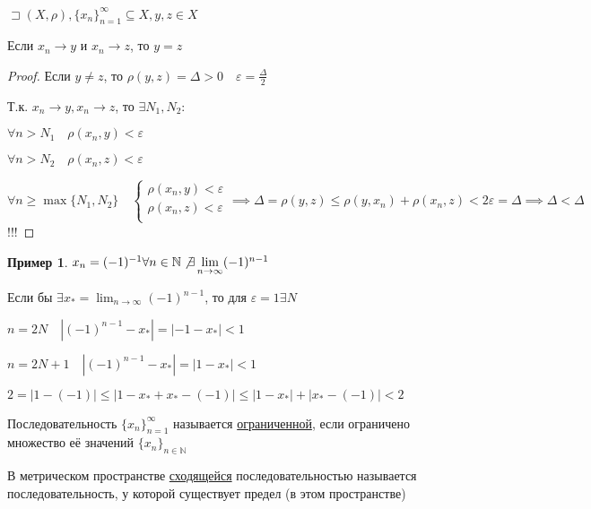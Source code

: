 \documentclass{book}
\newcommand\N{\ensuremath{\mathbb{N}}}
\theoremstyle{definition}
\newtheorem*{example}{Пример}
\begin{document}
    \begin{statement}

        $\sqsupset (X, \rho), \{x_n\}_{n=1}^{\infty }\subseteq X, y, z\in X $

        Если $x_n\to y$ и $x_n\to z$, то $y=z$
    \end{statement}
    \begin{proof}
        Если $y\neq z$, то $\rho(y,z) = \Delta>0\quad \varepsilon = \frac{\Delta}{2}$

        Т.к. $x_n \to y, x_{n} \to z$, то $\exists N_1, N_2:$

        $\forall n>N_1\quad \rho(x_n,y)<\varepsilon$

        $\forall n>N_2\quad \rho(x_n,z)<\varepsilon$

        $\forall n\geqslant \max\{N_1, N_2\}\quad \begin{cases}
            \rho(x_{n} , y)<\varepsilon \\
            \rho(x_{n} , z)<\varepsilon\\
        \end{cases} \implies  \Delta = \rho(y,z) \leqslant  \rho(y, x_{n}) + \rho(x_{n} , z)<2\varepsilon = \Delta \implies \Delta<\Delta $ !!!
    \end{proof}
    \begin{example}
        $x_n = (-1)^{-1} \forall n\in \N  \not\exists \lim_{n \to \infty} (-1)^{n-1}$

        Если бы $\exists x_* = \lim_{n \to \infty} (-1)^{n-1}$, то для $\varepsilon = 1 \exists N$

        $n=2N\quad \left| (-1)^{n-1} - x_* \right| = |-1-x_*|<1 $

        $n=2N+1\quad \left| (-1)^{n-1} - x_* \right| = |1-x_*|<1 $

    $2 = |1 - (-1)|\leqslant |1-x_* + x_*-(-1)| \leqslant |1-x_*| + |x_* - (-1)| <2$
    \end{example}

    \begin{definition}
        Последовательность $\{x_n\}_{n=1}^{\infty }$ называется \underline{ограниченной}, если ограничено множество её значений $\{x_n\}_{n\in \N }$ 
    \end{definition}

    \begin{definition}
        В метрическом пространстве \underline{сходящейся} последовательностью называется последовательность, у которой существует предел (в этом пространстве)
    \end{definition}
\end{document}
